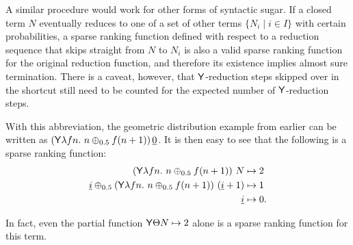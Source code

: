 A similar procedure would work for other forms of syntactic sugar. If a closed term $N$ eventually reduces to one of a set of other terms $\{N_i \mid i \in I\}$ with certain probabilities, a sparse ranking function defined with respect to a reduction sequence that skips straight from $N$ to $N_i$ is also a valid sparse ranking function for the original reduction function, and therefore its existence implies almost sure termination. There is a caveat, however, that $\mathsf{Y}$-reduction steps skipped over in the shortcut still need to be counted for the expected number of $\mathsf{Y}$-reduction steps.

With this abbreviation, the geometric distribution example from earlier can be written as $(\tY \lambda f n.\ n \oplus_{0.5} f(n+1)) \, \underline 0$. It is then easy to see that the following is a sparse ranking function:
\begin{align*}
(\tY \lambda f n.\ n \oplus_{0.5} f(n+1))\ N & \mapsto 2 \\
\underline i \oplus_{0.5} (\tY \lambda f n.\ n \oplus_{0.5} f(n+1))\ (\underline i + 1) & \mapsto 1 \\
\underline i & \mapsto 0.
\end{align*}

In fact, even the partial function $\mathsf{Y} \Theta N \mapsto 2$ alone is a sparse ranking function for this term.
